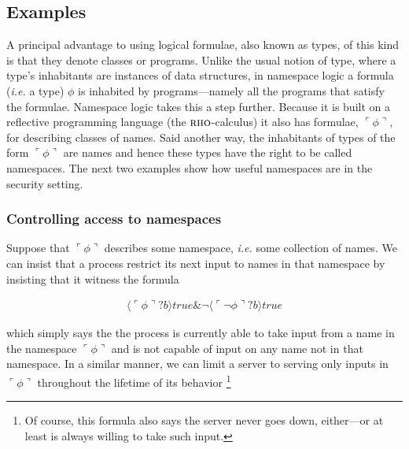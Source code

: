 \documentclass[]{acm_proc_article-sp}
\newcommand{\lpquote}{\ulcorner}
\newcommand{\rpquote}{\urcorner}
\newcommand{\ptrue}{\mathbin{true}}
\newcommand{\pquotep}[1]{\lpquote #1 \rpquote}
\newcommand{\pprefix}[3]{\langle #1 ? #2 \rangle #3}
\numberwithin{equation}{subsection}
\newcommand{\pic}{$\pi$-calculus}
\newcommand{\rhoc}{${\textsc{rho}}$-calculus}
\begin{document}

\subsection{Examples}

A principal advantage to using logical formulae, also known as types, of this
kind is that they denote classes or programs. Unlike the usual notion
of type, where a type's inhabitants are instances of data structures,
in namespace logic a formula ({\em i.e.} a type) $\phi$ is inhabited by
programs---namely all the programs that satisfy the
formulae. Namespace logic takes this a step further. Because it is
built on a reflective programming language (the \rhoc) it also has
formulae, $\pquotep{\phi}$, for describing classes of names. Said
another way, the inhabitants of types of the form $\pquotep{\phi}$ are
names and hence these types have the right to be called
namespaces. The next two examples show how useful namespaces are in
the security setting.

\subsubsection{Controlling access to namespaces}
\label{namespace}
Suppose that $\pquotep{\phi}$ describes some namespace, {\em i.e.} some
collection of names. We can insist that a process restrict its next
input to names in that namespace by insisting that it witness the formula

\begin{eqnarray}
  \pprefix{\pquotep{\phi}}{b}{\ptrue} \& \neg \pprefix{\pquotep{\neg \phi}}{b}{\ptrue} \nonumber
\end{eqnarray}

\noindent which simply says the the process is currently able to take input from
a name in the namespace $\pquotep{\phi}$ and is not capable of input on
any name not in that namespace. In a similar manner, we can limit a
server to serving only inputs in $\pquotep{\phi}$ throughout the
lifetime of its behavior \footnote{Of course, this formula also says
the server never goes down, either---or at least is always willing
to take such input.}
\end{document}
